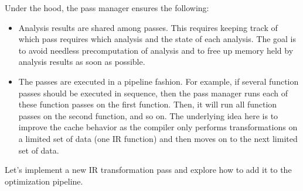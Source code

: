 Under the hood, the pass manager ensures the following:

\begin{itemize}
\item
Analysis results are shared among passes. This requires keeping track of which pass requires which analysis and the state of each analysis. The goal is to avoid needless precomputation of analysis and to free up memory held by analysis results as soon as possible.

\item
The passes are executed in a pipeline fashion. For example, if several function passes should be executed in sequence, then the pass manager runs each of these function passes on the first function. Then, it will run all function passes on the second function, and so on. The underlying idea here is to improve the cache behavior as the compiler only performs transformations on a limited set of data (one IR function) and then moves on to the next limited set of data.
\end{itemize}

Let’s implement a new IR transformation pass and explore how to add it to the optimization pipeline.
















